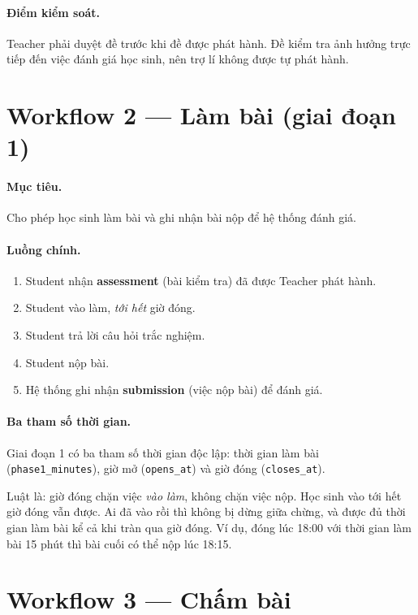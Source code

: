 \paragraph{Điểm kiểm soát.} Teacher phải duyệt đề trước khi đề được phát hành. Đề kiểm tra ảnh
hưởng trực tiếp đến việc đánh giá học sinh, nên trợ lí không được tự phát hành.

\section{Workflow 2 --- Làm bài (giai đoạn 1)}

\paragraph{Mục tiêu.} Cho phép học sinh làm bài và ghi nhận bài nộp để hệ thống đánh giá.

\paragraph{Luồng chính.}
\begin{enumerate}
  \item Student nhận \textbf{assessment} (bài kiểm tra) đã được Teacher phát hành.
  \item Student vào làm, \emph{tới hết} giờ đóng.
  \item Student trả lời câu hỏi trắc nghiệm.
  \item Student nộp bài.
  \item Hệ thống ghi nhận \textbf{submission} (việc nộp bài) để đánh giá.
\end{enumerate}

\paragraph{Ba tham số thời gian.}
\label{sec:ba-con-so}

Giai đoạn 1 có ba tham số thời gian độc lập: thời gian làm bài (\texttt{phase1\_minutes}), giờ mở
(\texttt{opens\_at}) và giờ đóng (\texttt{closes\_at}).

Luật là: giờ đóng chặn việc \emph{vào làm}, không chặn việc nộp. Học sinh vào tới hết giờ đóng vẫn
được. Ai đã vào rồi thì không bị dừng giữa chừng, và được đủ thời gian làm bài kể cả khi tràn qua giờ đóng.
Ví dụ, đóng lúc 18:00 với thời gian làm bài 15 phút thì bài cuối có thể nộp lúc 18:15.

\section{Workflow 3 --- Chấm bài}

